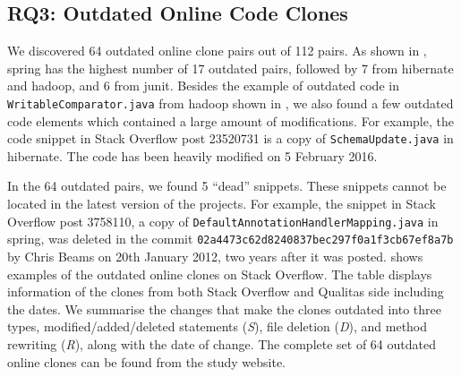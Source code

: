 \documentclass[sigconf,review, anonymous]{acmart}
\begin{document}
\subsection{RQ3: Outdated Online Code Clones}



We discovered 64 outdated online clone pairs out of 112 pairs. As
shown in , \textsf{spring} has the highest number
of 17 outdated pairs, followed by 7 from \textsf{hibernate} and
\textsf{hadoop}, and 6 from \textsf{junit}. Besides the example of
outdated code in %
{\small{\texttt{WritableComparator.java}}} 
from \textsf{hadoop} shown in
, we also found a few outdated code elements
which contained a large amount of modifications. For example, the code
snippet in Stack Overflow post 23520731 is a copy of
{\small{\texttt{SchemaUpdate.java}}} in \textsf{hibernate}. The code
has been heavily modified on 5 February 2016.

In the 64 outdated pairs, we found 5 ``dead'' snippets. These snippets
cannot be located in the latest version of the projects. For example,
the snippet in Stack Overflow post 3758110, a copy of
{\small{\texttt{DefaultAnnotationHandlerMapping.java}}} in
\textsf{spring}, was deleted in the commit
{\small{\texttt{02a4473c62d8240837bec297f0a1f3cb67ef8a7b}}} by Chris
Beams on 20th January 2012, two years after it was
posted. 
 shows examples of the outdated online
clones on Stack Overflow. The table displays information of the clones
from both Stack Overflow and Qualitas side including the dates. We
summarise the changes that make the clones outdated into three types,
modified/added/deleted statements (\textit{S}), file deletion
(\textit{D}), and method rewriting (\textit{R}), along with the date
of change. The complete set of 64 outdated online clones can be found
from the study website.
\end{document}
